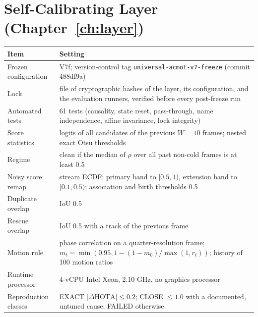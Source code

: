 \section{Self-Calibrating Layer (Chapter~\ref{ch:layer})}
\begin{longtable}{@{}p{4.6cm}p{9.8cm}@{}}
\toprule
Item & Setting \\
\midrule
Frozen configuration & V7f; version-control tag \texttt{universal-acmot-v7-freeze} (commit 488df9a) \\
Lock & file of cryptographic hashes of the layer, its configuration, and the evaluation runners, verified before every post-freeze run \\
Automated tests & 61 tests (causality, state reset, pass-through, name independence, affine invariance, lock integrity) \\
Score statistics & logits of all candidates of the previous $W=10$ frames; nested exact Otsu thresholds \\
Regime & clean if the median of $\rho$ over all past non-cold frames is at least 0.5 \\
Noisy score remap & stream ECDF; primary band to $[0.5,1)$, extension band to $[0.1,0.5)$; association and birth thresholds 0.5 \\
Duplicate overlap & IoU 0.5 \\
Rescue overlap & IoU 0.5 with a track of the previous frame \\
Motion rule & phase correlation on a quarter-resolution frame; $m_t=\min(0.95,1-(1-m_0)/\max(1,r_t))$; history of 100 motion ratios \\
Runtime processor & 4-vCPU Intel Xeon, 2.10 GHz, no graphics processor \\
Reproduction classes & EXACT $|\Delta\mathrm{HOTA}|\le 0.2$; CLOSE $\le 1.0$ with a documented, untuned cause; FAILED otherwise \\
\bottomrule
\end{longtable}
